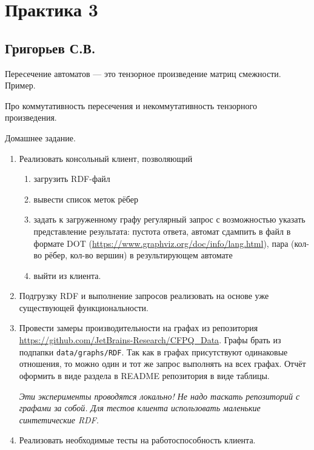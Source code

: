 \section{Практика 3}

\subsection{Григорьев С.В.}

Пересечение автоматов --- это тензорное произведение матриц смежности. Пример.

Про коммутативность пересечения и некоммутативность тензорного произведения.

Домашнее задание.
\begin{enumerate}
	\item Реализовать консольный клиент, позволяющий
	\begin{enumerate}
		\item загрузить RDF-файл
		\item вывести список меток рёбер
		\item задать к загруженному графу регулярный запрос с возможностью указать представление результата: пустота ответа, автомат сдампить в файл в формате DOT (\url{https://www.graphviz.org/doc/info/lang.html}), пара (кол-во рёбер, кол-во вершин) в результирующем автомате
	    \item выйти из клиента.
    \end{enumerate}
	\item Подгрузку RDF и выполнение запросов реализовать на основе уже существующей функциональности.
	\item Провести замеры производительности на графах из репозитория \url{https://github.com/JetBrains-Research/CFPQ_Data}. Графы брать из подпапки \verb|data/graphs/RDF|. Так как в графах присутствуют одинаковые отношения, то можно один и тот же запрос выполнять на всех графах. Отчёт оформить в виде раздела в  README репозитория в виде таблицы. 

	\textit{Эти эксперименты проводятся локально! Не надо таскать репозиторий с графами за собой. Для тестов клиента использовать маленькие синтетические RDF.}
	\item Реализовать необходимые тесты на работоспособность клиента.
\end{enumerate} 